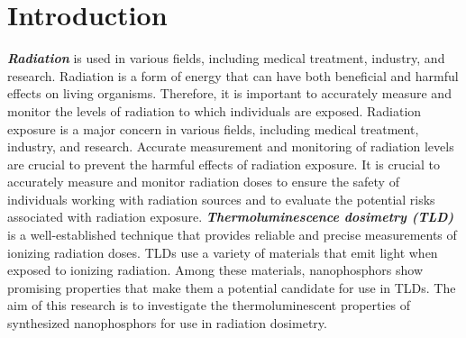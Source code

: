 \documentclass{article}[10pt]
\begin{document}



  \newpage
  \tableofcontents
  \newpage

  \section{Introduction}
    \textit{\textbf{Radiation}} is used in various fields, including medical treatment, industry, and research. 
    Radiation is a form of energy that can have both beneficial and harmful effects on living organisms.
    Therefore, it is important to accurately measure and monitor the levels of radiation to which individuals are exposed.
    Radiation exposure is a major concern in various fields, including medical treatment, industry, and research. Accurate 
    measurement and monitoring of radiation levels are crucial to prevent the harmful effects of radiation exposure.
    It is crucial to accurately measure and monitor radiation doses to ensure the safety of 
    individuals working with radiation sources and to evaluate the potential risks associated with radiation exposure. 
    \textit{\textbf{Thermoluminescence dosimetry (TLD)}} is a well-established technique that provides reliable and precise measurements 
    of ionizing radiation doses. TLDs use a variety of materials that emit light when exposed to ionizing radiation. 
    Among these materials, nanophosphors show promising properties that make them a potential candidate for use in TLDs. 
    The aim of this research is to investigate the thermoluminescent properties of synthesized nanophosphors for use in radiation dosimetry. 
    
\end{document}
